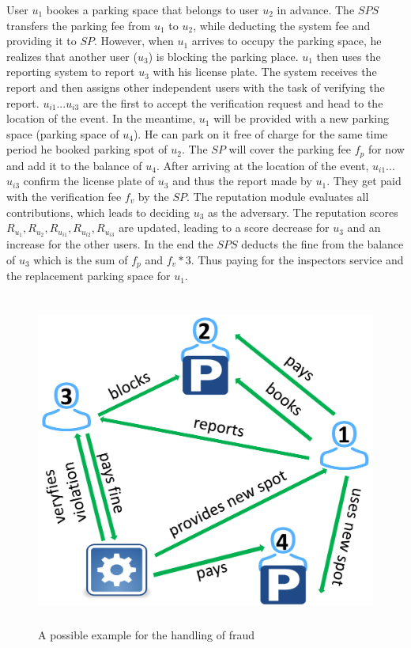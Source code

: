 User $u_1$ bookes a parking space that belongs to user $u_2$ in advance. The $SPS$ transfers the parking fee from $u_1$ to $u_2$, while deducting the system fee and providing it to $SP$. However, when $u_1$ arrives to occupy the parking space, he realizes that another user ($u_3$) is blocking the parking place. $u_1$ then uses the reporting system to report $u_3$ with his license plate. The system receives the report and then assigns other independent users with the task of verifying the report. $u_{i1}$...$u_{i3}$ are the first to accept the verification request and head to the location of the event. In the meantime, $u_1$ will be provided with a new parking space (parking space of $u_4$). He can park on it free of charge for the same time period he booked parking spot of $u_2$. The $SP$ will cover the parking fee $f_p$ for now and add it to the balance of $u_4$. After arriving at the location of the event, $u_{i1}$...$u_{i3}$ confirm the license plate of $u_3$ and thus the report made by $u_1$. They get paid with the verification fee $f_v$ by the $SP$. The reputation module evaluates all contributions, which leads to deciding $u_3$ as the adversary. The reputation scores $R_{u_1}, R_{u_2}, R_{u_{i1}}, R_{u_{i2}}, R_{u_{i3}}$ are updated, leading to a score decrease for $u_3$ and an increase for the other users. In the end the $SPS$ deducts the fine from the balance of $u_3$ which is the sum of $f_p$ and $f_v * 3$. Thus paying for the inspectors service and the replacement parking space for $u_1$. \\

\begin{figure}
	\centering
	\includegraphics[width=13cm,height=11cm]{example_grafik.pdf}
	\caption{A possible example for the handling of fraud}
	\label{img:example-grafik}
\end{figure}
 
